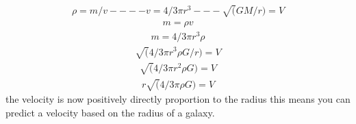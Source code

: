 \documentclass[10pt, twocolumn, twoside]{article}
\begin{document}
\begin{equation*}
\label{GaussE}
\begin{aligned}
\rho= m/v----v=4/3\pi r^3---\sqrt(GM/r)=V
\end{aligned}
\end{equation*}
\begin{equation*}
\label{GaussE}
\begin{aligned}
 m=\rho v
\end{aligned}
\end{equation*}
\begin{equation*}
\label{GaussE}
\begin{aligned}
 m= 4/3\pi r^3\rho
\end{aligned}
\end{equation*}
\begin{equation*}
\label{GaussE}
\begin{aligned}
\sqrt(4/3\pi r^3\rho G/r)=V
\end{aligned}
\end{equation*}
\begin{equation*}
\label{GaussE}
\begin{aligned}
\sqrt(4/3\pi r^2\rho G)=V
\end{aligned}
\end{equation*}
\begin{equation*}
\label{GaussE}
\begin{aligned}
r\sqrt(4/3\pi \rho G)=V
\end{aligned}
\end{equation*}
the velocity is now positively directly proportion to the radius
this means you can predict a velocity based on the radius of a galaxy.
\end{document}
